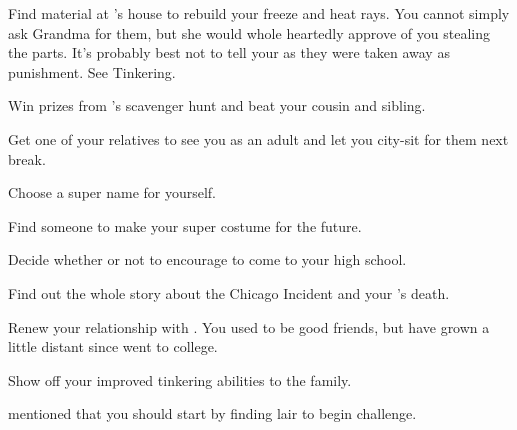 \documentclass[char]{LRSguildcamp1}
\begin{document}
 
\begin{itemz}[Goals]
	\item Find material at \cGrandma{}'s house to rebuild your freeze and heat rays. You cannot simply ask Grandma for them, but she would whole heartedly approve of you stealing the parts. It's probably best not to tell your \cArchitect{\parent} as they were taken away as punishment. See Tinkering. 
	
	\item Win prizes from \cGrandma{}'s scavenger hunt and beat your cousin and sibling.
	
		\item Get one of your relatives to see you as an adult and let you city-sit for them next break.
		
		\item Choose a super name for yourself.
		
		\item Find someone to make your super costume for the future.  
		
		\item Decide whether or not to encourage \cTween{} to come to your high school.
		
		\item Find out the whole story about the Chicago Incident and your \cAS{\parent}'s death.
		
		\item Renew your relationship with \cGrad{}. You used to be good friends, but have grown a little distant since \cGrad{} went to college.
		
		\item Show off your improved tinkering abilities to the family.

		
\end{itemz}

\begin{itemz}[Notes]
	\item \cGrandma{} mentioned that you should start by finding \cGrandma{\their} lair to begin \cGrandma{\their} challenge.
\end{itemz}
\end{document}
